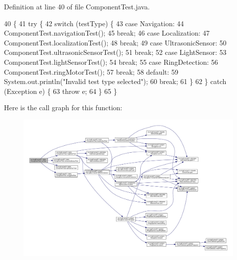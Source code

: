 Definition at line 40 of file Component\+Test.\+java.


\begin{DoxyCode}
40                                                              \{
41     \textcolor{keywordflow}{try} \{
42       \textcolor{keywordflow}{switch} (testType) \{
43         \textcolor{keywordflow}{case} Navigation:
44           ComponentTest.navigationTest();
45           \textcolor{keywordflow}{break};
46         \textcolor{keywordflow}{case} Localization:
47           ComponentTest.localizationTest();
48           \textcolor{keywordflow}{break};
49         \textcolor{keywordflow}{case} UltrasonicSensor:
50           ComponentTest.ultrasonicSensorTest();
51           \textcolor{keywordflow}{break};
52         \textcolor{keywordflow}{case} LightSensor:
53           ComponentTest.lightSensorTest();
54           \textcolor{keywordflow}{break};
55         \textcolor{keywordflow}{case} RingDetection:
56           ComponentTest.ringMotorTest();
57           \textcolor{keywordflow}{break};
58         \textcolor{keywordflow}{default}:
59           System.out.println(\textcolor{stringliteral}{"Invalid test type selected"});
60           \textcolor{keywordflow}{break};
61       \}
62     \} \textcolor{keywordflow}{catch} (Exception e) \{
63       \textcolor{keywordflow}{throw} e;
64     \}
65   \}
\end{DoxyCode}
Here is the call graph for this function\+:
\nopagebreak
\begin{figure}[H]
\begin{center}
\leavevmode
\includegraphics[width=350pt]{enumca_1_1mcgill_1_1ecse211_1_1tests_1_1_component_test_a5dc8bf97bc48adf5bee88d425a1a974e_cgraph}
\end{center}
\end{figure}
\mbox{\label{enumca_1_1mcgill_1_1ecse211_1_1tests_1_1_component_test_ae85caa20c6391bacc4fdbd411ee3f113}} 
